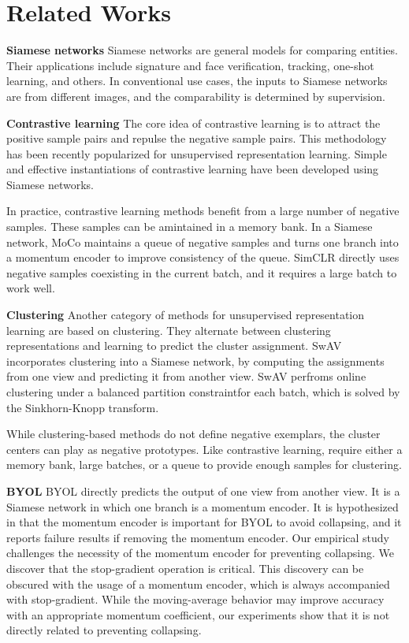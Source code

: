 \documentclass[conference]{IEEEtran}
\begin{document}
\section{Related Works}
\textbf{Siamese networks}
Siamese networks are general models for comparing entities. Their applications include signature and face verification, tracking, one-shot learning, and others. In conventional use cases, the inputs to Siamese networks are from different images, and the 
comparability is determined by supervision.

\textbf{Contrastive learning}
The core idea of contrastive learning is to attract the positive sample pairs and repulse the negative sample pairs.
This methodology has been recently popularized for unsupervised representation learning. Simple and effective instantiations of contrastive learning have been developed 
using Siamese networks.

In practice, contrastive learning methods benefit from a large number of negative samples. These samples can be amintained in a memory bank. In a Siamese network, MoCo maintains a queue of negative samples and turns one branch into a momentum encoder to improve consistency of the queue.
SimCLR directly uses negative samples coexisting in the current batch, and it requires a large batch to work well. 

\textbf{Clustering} Another category of methods for unsupervised representation learning are based on clustering.
They alternate between clustering representations and learning to predict the cluster assignment.
SwAV incorporates clustering into a Siamese network, by computing the assignments from one view and predicting it from another view.
SwAV perfroms online clustering under a balanced partition constraintfor each batch, which is solved by the Sinkhorn-Knopp transform.

While clustering-based methods do not define negative exemplars, the cluster centers can play as negative prototypes. Like contrastive learning, 
require either a memory bank, large batches, or a queue to provide enough samples for clustering.

\textbf{BYOL} BYOL directly predicts the output of one view from another view. It is a Siamese network in which one branch is a momentum encoder. It is hypothesized in that the momentum encoder is important for BYOL to avoid collapsing,
and it reports failure results if removing the momentum encoder. Our empirical study challenges the necessity of the momentum encoder for preventing collapsing.
We discover that the stop-gradient operation is critical. This discovery can be obscured with the usage of a momentum encoder, which is always accompanied with stop-gradient. While the moving-average behavior may improve accuracy with an appropriate momentum coefficient, our experiments show that it is not directly related to preventing collapsing.
\end{document}
